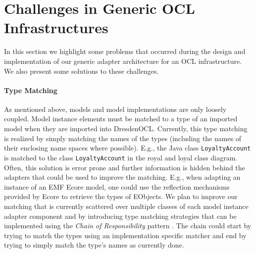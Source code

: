 \section{Challenges in Generic OCL Infrastructures}

  In this section we highlight some problems that occurred during the design
  and implementation of our generic adapter architecture for an OCL infrastructure.
  We also present some solutions to these challenges.

	\paragraph{Type Matching}
	As mentioned above, models and model implementations are only loosely 
	coupled. Model instance elements must be matched to a type of an imported model
	when they are imported into DresdenOCL. Currently, this type matching is realized by simply 
	matching the names of the types (including the names of 
	their enclosing name spaces where possible). E.g., the Java class \texttt{LoyaltyAccount} is
	matched to the class \texttt{LoyaltyAccount} in the royal and loyal class diagram.
	Often, this solution is error prone and further information is hidden behind the adapters that could be 
	used to improve the matching. E.g., when adapting an instance of an EMF 
	Ecore model, one could use the reflection mechanisms provided by Ecore to
	retrieve the types of EObjects. We plan to improve our matching
	that is currently scattered over multiple classes of each model instance 
	adapter component and by introducing type matching strategies that 
	can be implemented using the \emph{Chain of Responsibility} 
	pattern \cite{gamma:dp}. The chain could start by trying to match the 
	types using an implementation specific matcher and end by trying to 
	simply match the type's names as currently done.
	
